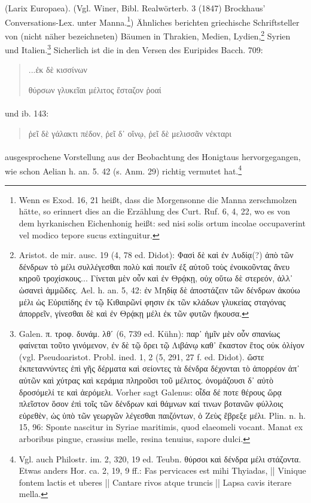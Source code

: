 \documentclass[a4paper, 11pt, oneside]{article}
\begin{document}
(Larix Europaea). (Vgl. Winer, Bibl. Realwörterb. 3 (1847) Brockhaus' Conversations-Lex. unter Manna.\footnote{Wenn es Exod. 16, 21 heißt, dass die Morgensonne die Manna zerschmolzen hätte, so erinnert dies an die Erzählung des Curt. Ruf. 6, 4, 22, wo es von dem hyrkanischen Eichenhonig heißt: sed nisi solis ortum incolae occupaverint vel modico tepore sucus extinguitur.}) Ähnliches berichten griechische Schriftsteller von (nicht näher bezeichneten) Bäumen in Thrakien, Medien, Lydien,\footnote{Aristot. de mir. ausc. 19 (4, 78 ed. Didot): Φασὶ δὲ καὶ ἐν Λυδίᾳ(?) ἀπὸ τῶν δένδρων τὸ μέλι συλλέγεσθαι πολὺ καὶ ποιεῖν ἐξ αὐτοῦ τοὺς ἐνοικοῦντας ἄνευ κηροῦ τροχίσκους... Γίνεται μὲν οὖν καὶ ἐν Θρᾴκῃ, οὐχ οὕτω δὲ στερεόν, ἀλλ᾽ ὡσανεὶ ἀμμῶδες. Ael. h. an. 5, 42: ἐν Μηδίᾳ δὲ ἀποστάζειν τῶν δένδρων ἀκούω μέλι ὡς Εὐριπίδης ἐν τῷ Κιθαιρῶνί φησιν ἐκ τῶν κλάδων γλυκείας σταγόνας ἀπορρεῖν, γίνεσθαι δὲ καὶ ἐν Θρᾴκῃ μέλι ἐκ τῶν φυτῶν ἤκουσα.} Syrien und Italien.\footnote{Galen. π. τροφ. δυνάμ. λθʹ (6, 739 ed. Kühn): παρ᾽ ἡμῖν μὲν οὖν σπανίως φαίνεται τοῦτο γινόμενον, ἐν δὲ τῷ ὄρει τῷ Λιβάνῳ καθ᾽ ἕκαστον ἔτος οὐκ ὀλίγον (vgl. Pseudoaristot. Probl. ined. 1, 2 (5, 291, 27 f. ed. Didot). ὥστε ἐκπεταννύντες ἐπὶ γῆς δέρματα καὶ σείοντες τὰ δένδρα δέχονται τὸ ἀπορρέον ἀπ᾽ αὐτῶν καὶ χύτρας καὶ κεράμια πληροῦσι τοῦ μέλιτος. ὀνομάζουσι δ᾽ αὐτὸ δροσόμελί τε καὶ ἀερόμελι. Vorher sagt Galenus: οἷδα δέ ποτε θέρους ὥρᾳ πλεῖστον ὅσον ἐπὶ τοῖς τῶν δένδρων καὶ θάμνων καί τινων βοτανῶν φύλλοις εὐρεθὲν, ὡς ὑπὸ τῶν γεωργῶν λέγεσθαι παιζόντων, ὁ Ζεὺς ἔβρεξε μέλι. Plin. n. h. 15, 96: Sponte nascitur in Syriae maritimis, quod elaeomeli vocant. Manat ex arboribus pingue, crassius melle, resina tenuius, sapore dulci.} Sicherlich ist die in den Versen des Euripides Bacch. 709:
\begin{quotation}
...ἐκ δὲ κισσίνων

θύρσων γλυκεῖαι μέλιτος ἔσταζον ῥοαί
\end{quotation}
\paragraph{}
und ib. 143:
\begin{quotation}
ῥεῖ δὲ γάλακτι πέδον, ῥεῖ δ᾽ οἴνῳ, ῥεῖ δὲ μελισσᾶν νέκταρι
\end{quotation}
\paragraph{}
ausgesprochene Vorstellung aus der Beobachtung des Honigtaus hervorgegangen, wie schon Aelian h. an. 5. 42 (s. Anm. 29) richtig vermutet hat.\footnote{Vgl. auch Philostr. im. 2, 320, 19 ed. Teubn. θύρσοι καὶ δένδρα μέλι στάζοντα. Etwas anders Hor. ca. 2, 19, 9 ff.: Fas pervicaces est mihi Thyiadas, || Vinique fontem lactis et uberes || Cantare rivos atque truncis || Lapsa cavis iterare mella.}
\end{document}
